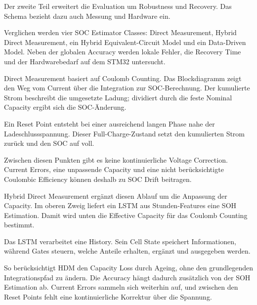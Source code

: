 
\begin{sprechtext}

Der zweite Teil erweitert die Evaluation um Robustness und Recovery. Das Schema bezieht dazu auch Messung und Hardware ein.

Verglichen werden vier SOC Estimator Classes: Direct Measurement, Hybrid Direct Measurement, ein Hybrid Equivalent-Circuit Model und ein Data-Driven Model. Neben der globalen Accuracy werden lokale Fehler, die Recovery Time und der Hardwarebedarf auf dem STM32 untersucht.

\end{sprechtext}


\begin{sprechtext}

Direct Measurement basiert auf Coulomb Counting. Das Blockdiagramm zeigt den Weg vom Current über die Integration zur SOC-Berechnung. Der kumulierte Strom beschreibt die umgesetzte Ladung; dividiert durch die feste Nominal Capacity ergibt sich die SOC-Änderung.

Ein Reset Point entsteht bei einer ausreichend langen Phase nahe der Ladeschlussspannung. Dieser Full-Charge-Zustand setzt den kumulierten Strom zurück und den SOC auf voll.

Zwischen diesen Punkten gibt es keine kontinuierliche Voltage Correction. Current Errors, eine unpassende Capacity und eine nicht berücksichtigte Coulombic Efficiency können deshalb zu SOC Drift beitragen.

\end{sprechtext}


\begin{sprechtext}

Hybrid Direct Measurement ergänzt diesen Ablauf um die Anpassung der Capacity. Im oberen Zweig liefert ein LSTM aus Stunden-Features eine SOH Estimation. Damit wird unten die Effective Capacity für das Coulomb Counting bestimmt.

Das LSTM verarbeitet eine History. Sein Cell State speichert Informationen, während Gates steuern, welche Anteile erhalten, ergänzt und ausgegeben werden.

So berücksichtigt HDM den Capacity Loss durch Ageing, ohne den grundlegenden Integrationspfad zu ändern. Die Accuracy hängt dadurch zusätzlich von der SOH Estimation ab. Current Errors sammeln sich weiterhin auf, und zwischen den Reset Points fehlt eine kontinuierliche Korrektur über die Spannung.

\end{sprechtext}

